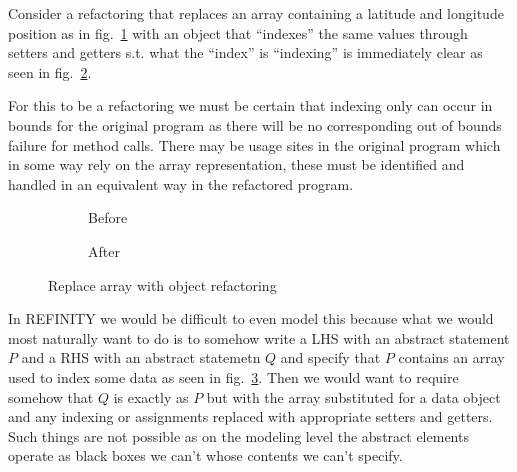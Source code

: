 Consider a refactoring that replaces an array containing a latitude and longitude position as in fig.~\ref{refa:ReplaceArray-before} with an object that ``indexes'' the same values through setters and getters s.t. what the ``index'' is ``indexing'' is immediately clear as seen in fig.~\ref{refa:ReplaceArray-after}.

For this to be a refactoring we must be certain that indexing only can occur in bounds for the original program as there will be no corresponding out of bounds failure for method calls. There may be usage sites in the original program which in some way rely on the array representation, these must be identified and handled in an equivalent way in the refactored program.

\begin{figure}
  \begin{subfigure}[h]{.45\linewidth} 
    
    \caption{Before}
    \label{refa:ReplaceArray-before}   
  \end{subfigure}\hspace{1cm}
  \begin{subfigure}[h]{.45\linewidth}
    
    \caption{After}
    \label{refa:ReplaceArray-after}
  \end{subfigure}
  \caption{Replace array with object refactoring}
  \label{refa:ReplaceArray}
\end{figure}

In REFINITY we would be difficult to even model this because what we would most naturally want to do is to somehow write a LHS with an abstract statement $P$ and a RHS with an abstract statemetn $Q$ and specify that $P$ contains an array used to index some data as seen in fig.~\ref{refa:ReplaceArray}. Then we would want to require somehow that $Q$ is exactly as $P$ but with the array substituted for a data object and any indexing or assignments replaced with appropriate setters and getters. Such things are not possible as on the modeling level the abstract elements operate as black boxes we can't whose contents we can't specify.  
